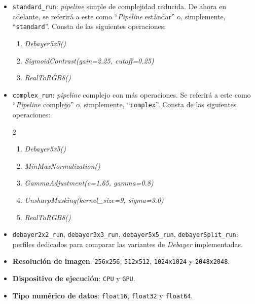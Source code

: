 \begin{itemize}[noitemsep]
	\item \texttt{standard\_run}: \textit{pipeline} simple de complejidad reducida. De ahora en adelante, se referirá 
	a este como ``\textit{Pipeline} estándar'' o, simplemente, ``\texttt{standard}''. Consta de las siguientes operaciones:
	      \begin{enumerate}[noitemsep]
		      \item \textit{Debayer5x5()}
		      \item \textit{SigmoidContrast(gain=2.25, cutoff=0.25)}
		      \item \textit{RealToRGB8()}
	      \end{enumerate}
	\item \texttt{complex\_run}: \textit{pipeline} complejo con más operaciones. Se referirá 
	a este como ``\textit{Pipeline} complejo'' o, simplemente, ``\texttt{complex}''. Consta de las siguientes operaciones:
	        {\setlength{\multicolsep}{0pt}
			\begin{multicols}{2}
				\begin{enumerate}[noitemsep]
					\item \textit{Debayer5x5()}
					\item \textit{MinMaxNormalization()}
					\item \textit{GammaAdjustment(c=1.65, gamma=0.8)}
					\item \textit{UnsharpMasking(kernel\_size=9, sigma=3.0)}
					\item \textit{RealToRGB8()}
				\end{enumerate}
			\end{multicols}
			}
	\item \texttt{debayer2x2\_run}, \texttt{debayer3x3\_run}, \texttt{debayer5x5\_run},
	      \texttt{debayerSplit\_run}: perfiles dedicados para comparar las variantes de \textit{Debayer} implementadas.
\end{itemize}


\begin{itemize}[noitemsep]
	\item \textbf{Resolución de imagen}: \texttt{256x256}, \texttt{512x512}, \texttt{1024x1024} y \texttt{2048x2048}.
	\item \textbf{Dispositivo de ejecución}: \texttt{CPU} y \texttt{GPU}.
	\item \textbf{Tipo numérico de datos}: \texttt{float16}, \texttt{float32} y \texttt{float64}.
\end{itemize}

